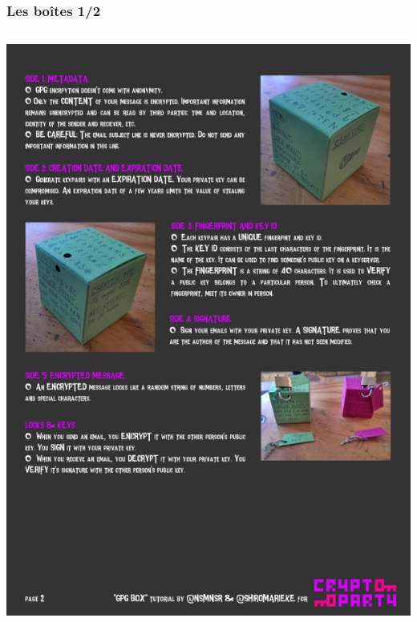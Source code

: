 \documentclass{beamer}
\begin{document}
\begin{frame}
\frametitle{Les boîtes 1/2}

\begin{columns}[c] 
\includegraphics[scale=0.28] {./images/GPGBox_02.png}

\end{columns}
\end{frame}
\end{document}
